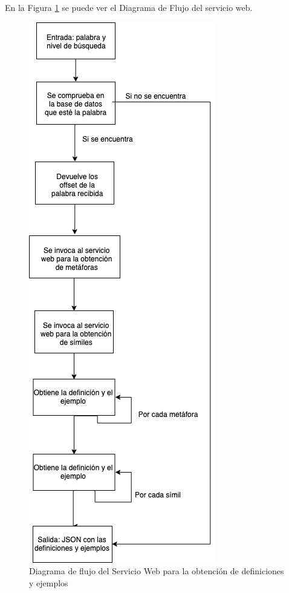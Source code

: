 En la Figura \ref{fig:swdef} se puede ver el Diagrama de Flujo del servicio web.
\begin{figure}[!h]
	\includegraphics[width=.9\textwidth]{Imagenes/Bitmap/Capitulo4/ServiciosWeb/DiagramaFlujoDefinicionYEjemplo.png}
	\centering
	\caption{Diagrama de flujo del Servicio Web para la obtención de definiciones y ejemplos}
	\label{fig:swdef}
\end{figure}


